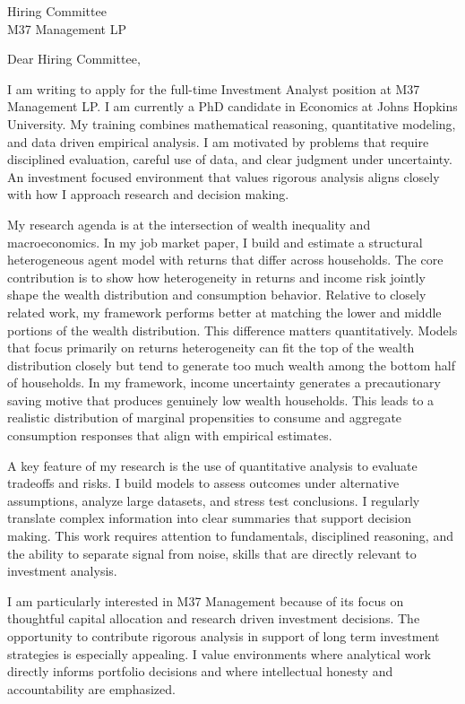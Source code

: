 \documentclass[11pt]{letter}
\begin{document}
\begin{letter}{Hiring Committee \\ M37 Management LP}

\opening{Dear Hiring Committee,}

I am writing to apply for the full-time Investment Analyst position at M37 Management LP. I am currently a PhD candidate in Economics at Johns Hopkins University. My training combines mathematical reasoning, quantitative modeling, and data driven empirical analysis. I am motivated by problems that require disciplined evaluation, careful use of data, and clear judgment under uncertainty. An investment focused environment that values rigorous analysis aligns closely with how I approach research and decision making.

My research agenda is at the intersection of wealth inequality and macroeconomics. In my job market paper, I build and estimate a structural heterogeneous agent model with returns that differ across households. The core contribution is to show how heterogeneity in returns and income risk jointly shape the wealth distribution and consumption behavior. Relative to closely related work, my framework performs better at matching the lower and middle portions of the wealth distribution. This difference matters quantitatively. Models that focus primarily on returns heterogeneity can fit the top of the wealth distribution closely but tend to generate too much wealth among the bottom half of households. In my framework, income uncertainty generates a precautionary saving motive that produces genuinely low wealth households. This leads to a realistic distribution of marginal propensities to consume and aggregate consumption responses that align with empirical estimates.

A key feature of my research is the use of quantitative analysis to evaluate tradeoffs and risks. I build models to assess outcomes under alternative assumptions, analyze large datasets, and stress test conclusions. I regularly translate complex information into clear summaries that support decision making. This work requires attention to fundamentals, disciplined reasoning, and the ability to separate signal from noise, skills that are directly relevant to investment analysis.

I am particularly interested in M37 Management because of its focus on thoughtful capital allocation and research driven investment decisions. The opportunity to contribute rigorous analysis in support of long term investment strategies is especially appealing. I value environments where analytical work directly informs portfolio decisions and where intellectual honesty and accountability are emphasized.


\end{letter}
\end{document}
